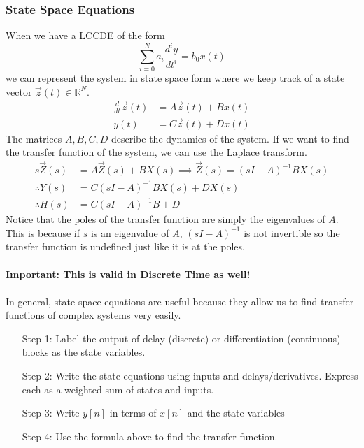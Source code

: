 \documentclass{article}
\begin{document}
\subsubsection{State Space Equations}
When we have a LCCDE of the form
$$\sum_{i=0}^{N}{a_i\frac{d^iy}{dt^i}} = b_0x(t)$$
we can represent the system in state space form where we keep track of a state vector $\vec{z}(t)\in\mathbb{R}^N$.
\begin{align*}
    \frac{d}{dt}\vec{z}(t) &= A\vec{z}(t)+Bx(t)\\
    y(t) &= C\vec{z}(t)+Dx(t)
\end{align*}
The matrices $A,B,C,D$ describe the dynamics of the system.
If we want to find the transfer function of the system, we can use the Laplace transform.
\begin{align*}
    s\vec{Z}(s) &= A\vec{Z}(s)+BX(s) \implies \vec{Z}(s) = (sI-A)^{-1}BX(s)\\
    \therefore Y(s) &= C(sI-A)^{-1}BX(s)+DX(s)\\
    \therefore H(s) &= C(sI-A)^{-1}B+D
\end{align*}
Notice that the poles of the transfer function are simply the eigenvalues of $A$. This is because
if $s$ is an eigenvalue of $A$, $(sI-A)^{-1}$ is not invertible so the transfer function is undefined
just like it is at the poles.\\\\
\textbf{Important: This is valid in Discrete Time as well!}\\\\
In general, state-space equations are useful because they allow us to find transfer functions of complex systems very easily.
\begin{itemize}
    \item[Step 1:] Label the output of delay (discrete) or differentiation (continuous) blocks as the state variables.
    \item[Step 2:] Write the state equations using inputs and delays/derivatives. Express each as a weighted sum of states and inputs.
    \item[Step 3:] Write $y[n]$ in terms of $x[n]$ and the state variables
    \item[Step 4:] Use the formula above to find the transfer function.  
\end{itemize}
\end{document}
